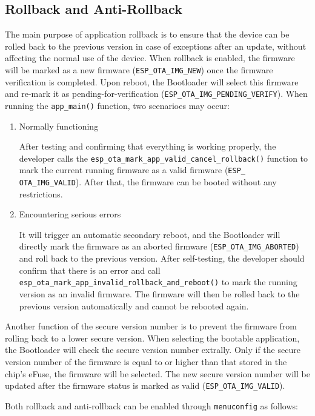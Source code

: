\documentclass[a4paper,12pt,openany]{book}
\begin{document}
\subsection{Rollback and Anti-Rollback}
The main purpose of application rollback is to ensure that the device can be rolled back to the previous version in case of exceptions after an update, without affecting the normal use of the device. When rollback is enabled, the firmware will be marked as a new firmware (\verb|ESP_OTA_IMG_NEW|) once the firmware verification is completed. Upon reboot, the Bootloader will select this firmware and re-mark it as pending-for-verification (\verb|ESP_OTA_IMG_PENDING_VERIFY|). When running the \verb|app_main()| function, two scenarioes may occur:

\begin{enumerate}[label=(\arabic*)]
    \item Normally functioning
    
    After testing and confirming that everything is working properly, the developer calls the \verb|esp_ota_mark_app_valid_cancel_rollback()| function to mark the current running firmware as a valid firmware (\verb|ESP_ OTA_IMG_VALID|). After that, the firmware can be booted without any restrictions.
    \item Encountering serious errors
    
    It will trigger an automatic secondary reboot, and the Bootloader will directly mark the firmware as an aborted firmware (\verb|ESP_OTA_IMG_ABORTED|) and roll back to the previous version. After self-testing, the developer should confirm that there is an error and call \verb|esp_ota_mark_app_invalid_rollback_and_reboot()| to mark the running version as an invalid firmware. The firmware will then be rolled back to the previous version automatically and cannot be rebooted again.
\end{enumerate}

Another function of the secure version number is to prevent the firmware from rolling back to a lower secure version. When selecting the bootable application, the Bootloader will check the secure version number extrally. Only if the secure version number of the firmware is equal to or higher than that stored in the chip’s eFuse, the firmware will be selected. The new secure version number will be updated after the firmware status is marked as valid (\verb|ESP_OTA_IMG_VALID|).

Both rollback and anti-rollback can be enabled through \verb|menuconfig| as follows:
\end{document}
